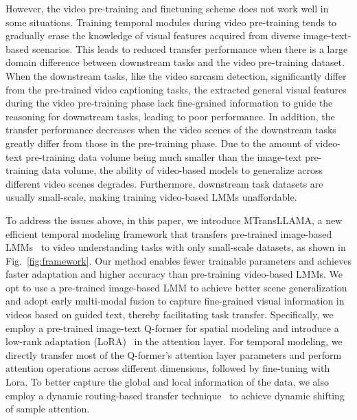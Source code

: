 However, the video pre-training and finetuning scheme does not work well in some situations.
Training temporal modules during video pre-training tends to gradually erase the knowledge of visual features acquired from diverse image-text-based scenarios. This leads to reduced transfer performance when there is a large domain difference between downstream tasks and the video pre-training dataset.
When the downstream tasks, like the video sarcasm detection, significantly differ from the pre-trained video captioning tasks, 
the extracted general visual features during the video pre-training phase lack fine-grained information to guide the reasoning for downstream tasks, leading to poor performance.
In addition, the transfer performance decreases when the video scenes of the downstream tasks greatly differ from those in the pre-training phase. Due to the amount of video-text pre-training data volume being much smaller than the image-text pre-training data volume, the ability of video-based models to generalize across different video scenes degrades.
Furthermore, downstream task datasets are usually small-scale, making training video-based LMMs unaffordable. 


To address the issues above, in this paper, we introduce MTransLLAMA, a new efficient temporal modeling framework that transfers pre-trained image-based LMMs~\cite{li2023blip} to video understanding tasks with only small-scale datasets, as shown in Fig.~\ref{fig:framework}. 
Our method enables fewer trainable parameters and achieves faster adaptation and higher accuracy than pre-training video-based LMMs.
We opt to use a pre-trained image-based LMM to achieve better scene generalization and adopt early multi-modal fusion to capture fine-grained visual information in videos based on guided text, thereby facilitating task transfer.
Specifically, we employ a pre-trained image-text Q-former for spatial modeling and introduce a low-rank adaptation (LoRA)~\cite{hu2021lora} in the attention layer. For temporal modeling, we directly transfer most of the Q-former’s attention layer parameters and perform attention operations across different dimensions, followed by fine-tuning with Lora. 
To better capture the global and local information of the data,
we also employ a dynamic routing-based transfer technique~\cite{zhou2021trar} to achieve dynamic shifting of sample attention.



